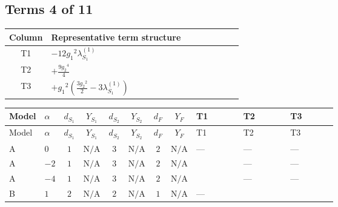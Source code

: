 \documentclass[8pt]{article}
\begin{document}
\begin{landscape}
\subsection*{Terms 4 of 11}
\begin{center}
\begin{tabular}{@{}c >{\raggedright\arraybackslash}p{0.82\linewidth}@{}}
\toprule
Column & Representative term structure \\
\midrule
T1 & \(\displaystyle -12 {g_1}^2 {\lambda_{S_1}^{(1)}}\) \\
\midrule
T2 & \(\displaystyle +\frac{9 {g_2}^4}{4}\) \\
\midrule
T3 & \(\displaystyle +{g_1}^2 \left(\frac{3 {g_2}^2}{2}-3 {\lambda_{S_1}^{(1)}}\right)\) \\
\midrule
\bottomrule
\end{tabular}
\end{center}
\smallskip
\tiny
\begin{longtable}{@{}llcccccc >{\raggedright\arraybackslash}p{0.21\linewidth} >{\raggedright\arraybackslash}p{0.21\linewidth} >{\raggedright\arraybackslash}p{0.21\linewidth}@{}}
\toprule
Model & $\alpha$ & $d_{S_1}$ & $Y_{S_1}$ & $d_{S_2}$ & $Y_{S_2}$ & $d_F$ & $Y_F$ & T1 & T2 & T3 \\
\midrule
\endfirsthead
\toprule
Model & $\alpha$ & $d_{S_1}$ & $Y_{S_1}$ & $d_{S_2}$ & $Y_{S_2}$ & $d_F$ & $Y_F$ & T1 & T2 & T3 \\
\midrule
\endhead
A & $0$ & $1$ & $\text{N/A}$ & $3$ & $\text{N/A}$ & $2$ & $\text{N/A}$ & --- & --- & --- \\
\midrule
A & $-2$ & $1$ & $\text{N/A}$ & $3$ & $\text{N/A}$ & $2$ & $\text{N/A}$ & \scriptsize\adjustbox{max width=\linewidth}{$\begin{gathered} -12 {g_1}^2 {\lambda_{S_1}^{(1)}}\end{gathered}$} & --- & --- \\
\midrule
A & $-4$ & $1$ & $\text{N/A}$ & $3$ & $\text{N/A}$ & $2$ & $\text{N/A}$ & \scriptsize\adjustbox{max width=\linewidth}{$\begin{gathered} -48 {g_1}^2 {\lambda_{S_1}^{(1)}}\end{gathered}$} & --- & --- \\
\midrule
B & $1$ & $2$ & $\text{N/A}$ & $2$ & $\text{N/A}$ & $1$ & $\text{N/A}$ & --- & \scriptsize\adjustbox{max width=\linewidth}{$\begin{gathered} +\frac{9 {g_2}^4}{4}\end{gathered}$} & \scriptsize\adjustbox{max width=\linewidth}{$\begin{gathered} +{g_1}^2 \left(\frac{3 {g_2}^2}{2}-3 {\lambda_{S_1}^{(1)}}\right)\end{gathered}$} \\

\end{longtable}
\end{landscape}
\end{document}
